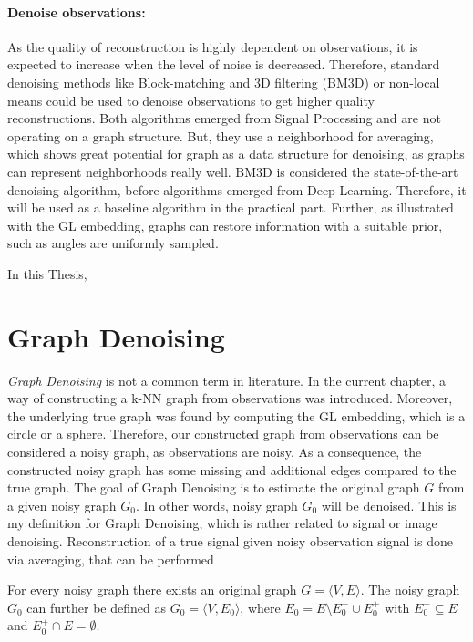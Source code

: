   \paragraph{Denoise observations:}
  As the quality of reconstruction is highly dependent on observations, it
  is expected to increase when the level of noise is decreased.
  Therefore, standard denoising methods like Block-matching and 3D filtering (BM3D) \cite{bm3d} or 
  non-local means \cite{noneLocalMean} could be used to denoise observations to get higher quality reconstructions.
  Both algorithms emerged from Signal Processing and are not operating on a graph structure. 
  But, they use a neighborhood for averaging, which shows great potential for graph 
  as a data structure for denoising, as graphs can represent neighborhoods really well.
  BM3D is considered the state-of-the-art denoising algorithm, before algorithms emerged from Deep Learning.
  Therefore, it will be used as a baseline algorithm in the practical part.
  Further, as illustrated with the GL embedding, graphs can restore information with a suitable prior,
  such as angles are uniformly sampled. 

  In this Thesis, 

\section{Graph Denoising}
\textit{Graph Denoising} is not a common term in literature.
In the current chapter, a way of constructing a k-NN graph from observations was introduced.
Moreover, the underlying true graph was found by computing the GL embedding, which is a circle or a sphere.
Therefore, our constructed graph from observations can be considered a noisy graph, 
as observations are noisy. 
As a consequence, the constructed noisy graph has some missing and additional edges compared to the true graph.
The goal of Graph Denoising is to estimate the original graph $G$ from a given noisy graph $G_0$.
In other words, noisy graph $G_0$ will be denoised.
This is my definition for Graph Denoising, which is rather related to signal or image denoising.
Reconstruction of a true signal given noisy observation signal is done via averaging, that can be performed

For every noisy graph there exists an original graph $G = \langle V,E \rangle$.
The noisy graph $G_0$ can further be defined as $G_0 = \langle V, E_0 \rangle$,  
 where $E_0 = E \setminus  E^{-}_0 \cup  E^{+}_0$ with $E^{-}_0 \subseteq E$ and $E^{+}_0 \cap E = \emptyset$.

